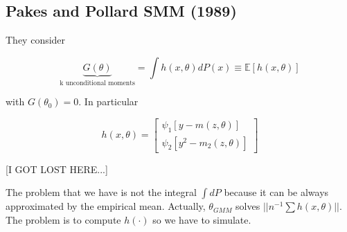 \documentclass[12pt]{article}
\begin{document}
\subsection*{Pakes and Pollard SMM (1989)}

	They consider 
	
	\begin{equation*}
		\underbrace{G(\theta)}_\text{k unconditional moments} = \int h(x, \theta) d P(x) \equiv \mathbb{E}[h(x, \theta)]
	\end{equation*}
	
	with $G(\theta_0) = 0$. In particular 
	
	\begin{equation*}
		h(x,\theta) = \left[ \begin{matrix}
			\psi_1 [y - m(z, \theta) ]\\
			\psi_2 [y^2 - m_2(z, \theta)]
		\end{matrix} \right]
	\end{equation*}
	
[I GOT LOST HERE...]

The problem that we have is not the integral $\int dP$ because it can be always approximated by the empirical mean. Actually, $\theta_{GMM}$ solves $|| n^{-1} \sum h(x,\theta)||$. The problem is to compute $h(\cdot)$ so we have to simulate. 
\end{document}

